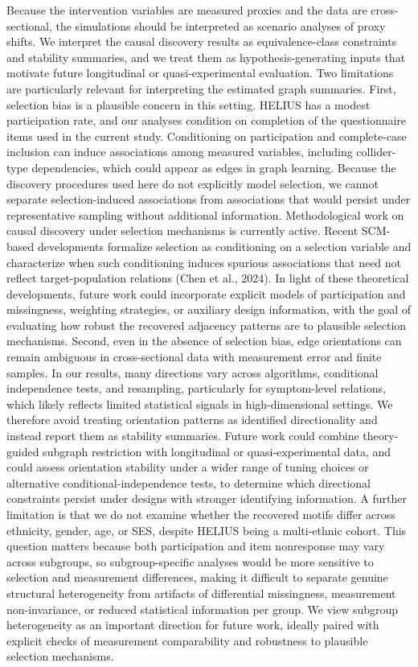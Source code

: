 \documentclass[
]{article}
\begin{document}
Because the intervention variables are measured proxies and the data are
cross-sectional, the simulations should be interpreted as scenario
analyses of proxy shifts. We interpret the causal discovery results as
equivalence-class constraints and stability summaries, and we treat them
as hypothesis-generating inputs that motivate future longitudinal or
quasi-experimental evaluation. Two limitations are particularly relevant
for interpreting the estimated graph summaries. First, selection bias is
a plausible concern in this setting. HELIUS has a modest participation
rate, and our analyses condition on completion of the questionnaire
items used in the current study. Conditioning on participation and
complete-case inclusion can induce associations among measured
variables, including collider-type dependencies, which could appear as
edges in graph learning. Because the discovery procedures used here do
not explicitly model selection, we cannot separate selection-induced
associations from associations that would persist under representative
sampling without additional information. Methodological work on causal
discovery under selection mechanisms is currently active. Recent
SCM-based developments formalize selection as conditioning on a
selection variable and characterize when such conditioning induces
spurious associations that need not reflect target-population relations
(Chen et al., 2024). In light of these theoretical developments, future
work could incorporate explicit models of participation and missingness,
weighting strategies, or auxiliary design information, with the goal of
evaluating how robust the recovered adjacency patterns are to plausible
selection mechanisms. Second, even in the absence of selection bias,
edge orientations can remain ambiguous in cross-sectional data with
measurement error and finite samples. In our results, many directions
vary across algorithms, conditional independence tests, and resampling,
particularly for symptom-level relations, which likely reflects limited
statistical signals in high-dimensional settings. We therefore avoid
treating orientation patterns as identified directionality and instead
report them as stability summaries. Future work could combine
theory-guided subgraph restriction with longitudinal or
quasi-experimental data, and could assess orientation stability under a
wider range of tuning choices or alternative conditional-independence
tests, to determine which directional constraints persist under designs
with stronger identifying information. A further limitation is that we
do not examine whether the recovered motifs differ across ethnicity,
gender, age, or SES, despite HELIUS being a multi-ethnic cohort. This
question matters because both participation and item nonresponse may
vary across subgroups, so subgroup-specific analyses would be more
sensitive to selection and measurement differences, making it difficult
to separate genuine structural heterogeneity from artifacts of
differential missingness, measurement non-invariance, or reduced
statistical information per group. We view subgroup heterogeneity as an
important direction for future work, ideally paired with explicit checks
of measurement comparability and robustness to plausible selection
mechanisms.
\end{document}
